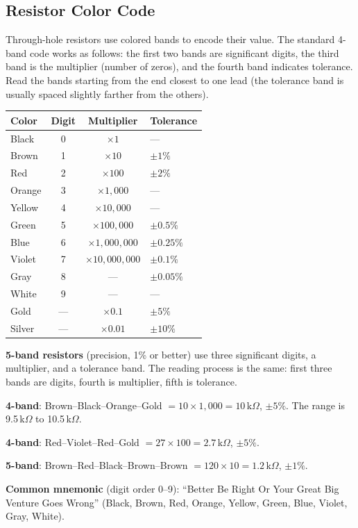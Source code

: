 \documentclass[11pt,letterpaper,twoside,openany]{book}
\begin{document}
\subsection{Resistor Color Code}
Through-hole resistors use colored bands to encode their value. The standard 4-band code works as follows: the first two bands are significant digits, the third band is the multiplier (number of zeros), and the fourth band indicates tolerance. Read the bands starting from the end closest to one lead (the tolerance band is usually spaced slightly farther from the others).

\begin{center}
\begin{tabular}{lccl}
\toprule
\textbf{Color} & \textbf{Digit} & \textbf{Multiplier} & \textbf{Tolerance} \\
\midrule
Black   & 0 & $\times 1$         & --- \\
Brown   & 1 & $\times 10$        & $\pm 1\%$ \\
Red     & 2 & $\times 100$       & $\pm 2\%$ \\
Orange  & 3 & $\times 1{,}000$   & --- \\
Yellow  & 4 & $\times 10{,}000$  & --- \\
Green   & 5 & $\times 100{,}000$ & $\pm 0.5\%$ \\
Blue    & 6 & $\times 1{,}000{,}000$ & $\pm 0.25\%$ \\
Violet  & 7 & $\times 10{,}000{,}000$ & $\pm 0.1\%$ \\
Gray    & 8 & ---                & $\pm 0.05\%$ \\
White   & 9 & ---                & --- \\
Gold    & --- & $\times 0.1$     & $\pm 5\%$ \\
Silver  & --- & $\times 0.01$    & $\pm 10\%$ \\
\bottomrule
\end{tabular}
\end{center}

\textbf{5-band resistors} (precision, 1\% or better) use three significant digits, a multiplier, and a tolerance band. The reading process is the same: first three bands are digits, fourth is multiplier, fifth is tolerance.

\begin{examplebox}
\textbf{4-band}: Brown--Black--Orange--Gold $= 10 \times 1{,}000 = 10\,\text{k}\Omega$, $\pm 5\%$. The range is 9.5\,k$\Omega$ to 10.5\,k$\Omega$.

\textbf{4-band}: Red--Violet--Red--Gold $= 27 \times 100 = 2.7\,\text{k}\Omega$, $\pm 5\%$.

\textbf{5-band}: Brown--Red--Black--Brown--Brown $= 120 \times 10 = 1.2\,\text{k}\Omega$, $\pm 1\%$.

\textbf{Common mnemonic} (digit order 0--9): ``Better Be Right Or Your Great Big Venture Goes Wrong'' (Black, Brown, Red, Orange, Yellow, Green, Blue, Violet, Gray, White).
\end{examplebox}
\end{document}
